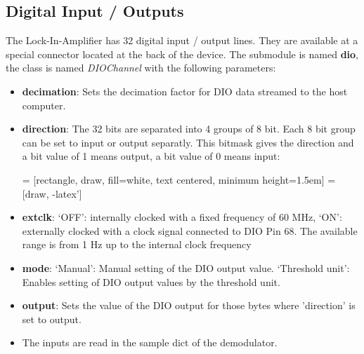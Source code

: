\documentclass[11pt]{article} %
\begin{document}
\subsection{Digital Input / Outputs}
The Lock-In-Amplifier has 32 digital input / output lines. They are available at a special connector located at the back of the device. The submodule is named {\bf dio}, the class is named {\it DIOChannel} with the following parameters:
\begin{itemize}
\item {\bf decimation}: Sets the decimation factor for DIO data streamed to the host computer.
\item {\bf direction}: The 32 bits are separated into 4 groups of 8 bit. Each 8 bit group can be set to input or output separatly. This bitmask gives the direction and a bit value of 1 means output, a bit value of 0 means input:

 = [rectangle, draw, fill=white, text centered, minimum height=1.5em]
 = [draw, -latex']

\item {\bf extclk}: `OFF': internally clocked with a fixed frequency of 60 MHz, `ON':  externally clocked with a clock signal connected to DIO Pin 68. The available range is from 1 Hz up to the internal clock frequency
\item {\bf mode}: `Manual': Manual setting of the DIO output value. `Threshold unit': Enables setting of DIO output values by the threshold unit.
\item {\bf output}: Sets the value of the DIO output for those bytes where 'direction' is set to output.
\item The inputs are read in the sample dict of the demodulator.
\end{itemize}
\end{document}
